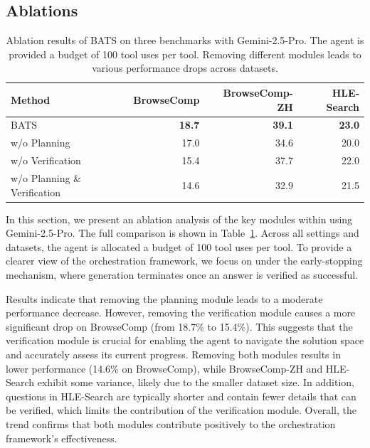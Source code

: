 \subsection{Ablations}

\begin{table}[h]
\centering
\caption{Ablation results of BATS on three benchmarks with Gemini-2.5-Pro. The agent is provided a budget of 100 tool uses per tool. Removing different modules leads to various performance drops across datasets.}
\label{tab:ablations}
\begin{tabular}{lrrr}
\toprule
\textbf{Method} & \textbf{BrowseComp} & \textbf{BrowseComp-ZH} & \textbf{HLE-Search} \\
\midrule
BATS             & \textbf{18.7} & \textbf{39.1} & \textbf{23.0} \\
\quad w/o Planning     & 17.0 & 34.6 & 20.0 \\
\quad w/o Verification & 15.4 & 37.7 & 22.0 \\
\quad w/o Planning \& Verification  & 14.6  & 32.9   & 21.5 \\
\bottomrule
\end{tabular}
\end{table}


In this section, we present an ablation analysis of the key modules within \method using Gemini-2.5-Pro. The full comparison is shown in Table~\ref{tab:ablations}. Across all settings and datasets, the agent is allocated a budget of 100 tool uses per tool. To provide a clearer view of the orchestration framework, we focus on \method under the early-stopping mechanism, where generation terminates once an answer is verified as successful.

Results indicate that removing the planning module leads to a moderate performance decrease. However, removing the verification module causes a more significant drop on BrowseComp (from 18.7\% to 15.4\%). This suggests that the verification module is crucial for enabling the agent to navigate the solution space and accurately assess its current progress. Removing both modules results in lower performance (14.6\% on BrowseComp), while BrowseComp-ZH and HLE-Search exhibit some variance, likely due to the smaller dataset size. In addition, questions in HLE-Search are typically shorter and contain fewer details that can be verified, which limits the contribution of the verification module. Overall, the trend confirms that both modules contribute positively to the orchestration framework's effectiveness.

